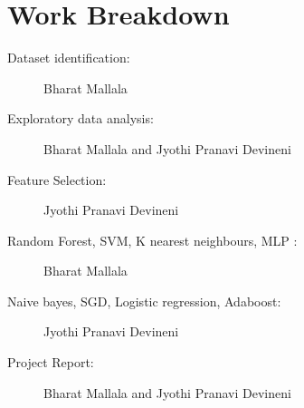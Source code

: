 \documentclass[sigconf]{acmart}
\begin{document}
\newpage
\appendix 
\section{Work Breakdown} 
\begin{description} 
\item[Dataset identification:] Bharat Mallala
\item[Exploratory data analysis:] Bharat Mallala and Jyothi Pranavi Devineni
\item[Feature Selection:] Jyothi Pranavi Devineni
\item[Random Forest, SVM, K nearest neighbours, MLP :] Bharat Mallala
\item[Naive bayes, SGD, Logistic regression, Adaboost:] Jyothi Pranavi Devineni
\item[Project Report:] Bharat Mallala and Jyothi Pranavi Devineni
\end{description} 


 
\end{document}
